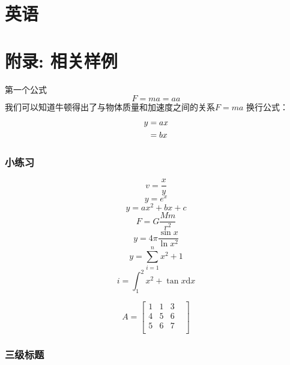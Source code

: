 \documentclass[UTF8]{ctexart}
\begin{document}
\section{英语}



\section{附录: 相关样例}
第一个公式
\begin{equation}
	F=ma=aa
\end{equation}
我们可以知道牛顿得出了与物体质量和加速度之间的关系$F=ma$
换行公式：
\begin{align}
	y & =ax\notag \\
	  & =bx
\end{align}

\subsubsection{小练习}
\begin{equation}
	v=\frac{x}{y}
\end{equation}
\begin{equation}
	y=e^{x}
\end{equation}
\begin{equation}
	y=ax^2+bx+c
\end{equation}
\begin{equation}
	F=G\frac{Mm}{r^2}
\end{equation}
\begin{equation}
	y=4\pi \frac{\sin{x}}{\ln{x^2}}
\end{equation}
\begin{equation}
	y=\sum^{n}_{i=1} x^2+1
\end{equation}
\begin{equation}
	i=\int_{1}^{2}x^2+\tan{x}\mathrm{d}x
\end{equation}

\begin{equation}
	A=\begin{bmatrix}
		1 & 1 & 3 \\4&5&6\\5&6&7&\\
	\end{bmatrix}
\end{equation}
\subsubsection{三级标题}
\end{document}
